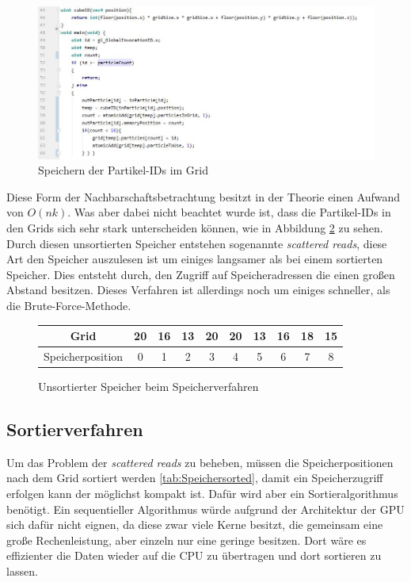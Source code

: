 \documentclass[intern,palatino]{cgBA}
\begin{document}
\begin{figure}[H]
	\centering
	\includegraphics[width=1.3\columnwidth]{Bilder/StoringLable.jpg}
	\caption{Speichern der Partikel-IDs im Grid }
	\label{img:Storinglable}
\end{figure}

Diese Form der Nachbarschaftsbetrachtung besitzt in der Theorie einen Aufwand von $O(n k)$. Was aber dabei nicht beachtet wurde ist, dass die Partikel-IDs in den Grids sich sehr stark unterscheiden können, wie in Abbildung \ref{tab:Speicher} zu sehen.
\newline
Durch diesen unsortierten Speicher entstehen sogenannte \textit{scattered reads}, diese Art den Speicher auszulesen ist um einiges langsamer als bei einem sortierten Speicher. Dies entsteht durch, den Zugriff auf Speicheradressen die einen großen Abstand besitzen.
\newline
Dieses Verfahren ist allerdings noch um einiges schneller, als die Brute-Force-Methode.

\begin{figure}[H]
	\centering
	\begin{tabular}{ | c || c | c | c | c | c | c | c | c | c |}
		\hline
		Grid 				&  20 & 16 & 13 & 20 & 20 & 13 & 16 & 18 & 15	\\ \hline
		Speicherposition	&   0 &  1 &  2 &  3 &  4 &  5 &  6 &  7 &  8	\\
		\hline
	\end{tabular}
	\caption{Unsortierter Speicher beim Speicherverfahren}
	\label{tab:Speicher}
\end{figure}


\subsection{Sortierverfahren}\label{sortieren}
Um das Problem der \textit{scattered reads} zu beheben, müssen die Speicherpositionen nach dem Grid sortiert werden \ref{tab:Speichersorted}, damit ein Speicherzugriff erfolgen kann der möglichst kompakt ist. Dafür wird aber ein Sortieralgorithmus benötigt. Ein sequentieller Algorithmus würde aufgrund der Architektur der GPU sich dafür nicht eignen, da diese zwar viele Kerne besitzt, die gemeinsam eine große Rechenleistung, aber einzeln nur eine geringe besitzen. Dort wäre es effizienter die Daten wieder auf die CPU zu übertragen und dort sortieren zu lassen.
\end{document}
